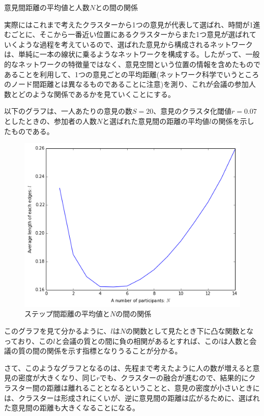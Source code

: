 意見間距離の平均値と人数$N$との間の関係

実際にはこれまで考えたクラスターから1つの意見が代表して選ばれ、時間が1進むごとに、そこから一番近い位置にあるクラスターからまた1つ意見が選ばれていくような過程を考えているので、選ばれた意見から構成されるネットワークは、単純に一本の線状に乗るようなネットワークを構成する。したがって、一般的なネットワークの特徴量ではなく、意見空間という位置の情報を含めたものであることを利用して、1つの意見ごとの平均距離(ネットワーク科学でいうところのノード間距離とは異なるものであることに注意)を測り、これが会議の参加人数とどのような関係であるかを見ていくことにする。

以下のグラフは、一人あたりの意見の数$S=20$、意見のクラスタ化閾値$r=0.07$としたときの、参加者の人数$N$と選ばれた意見間の距離の平均値$l$の関係を示したものである。
\begin{figure}[H]
    \begin{center}
        \includegraphics[width=12.5cm]{../img/N_l.png}
        \caption{ステップ間距離の平均値と$N$の間の関係}
        \label{fig:f24}
    \end{center}
\end{figure}
このグラフを見て分かるように、$l$は$N$の関数として見たとき下に凸な関数となっており、この$l$と会議の質との間に負の相関があるとすれば、この$l$は人数と会議の質の間の関係を示す指標となりうることが分かる。

さて、このようなグラフとなるのは、先程まで考えたように人の数が増えると意見の密度が大きくなり、同じ$r$でも、クラスターの融合が進むので、結果的にクラスター間の距離は離れることとなるということと、意見の密度が小さいときには、クラスターは形成されにくいが、逆に意見間の距離は広がるために、選ばれた意見間の距離も大きくなることになる。

